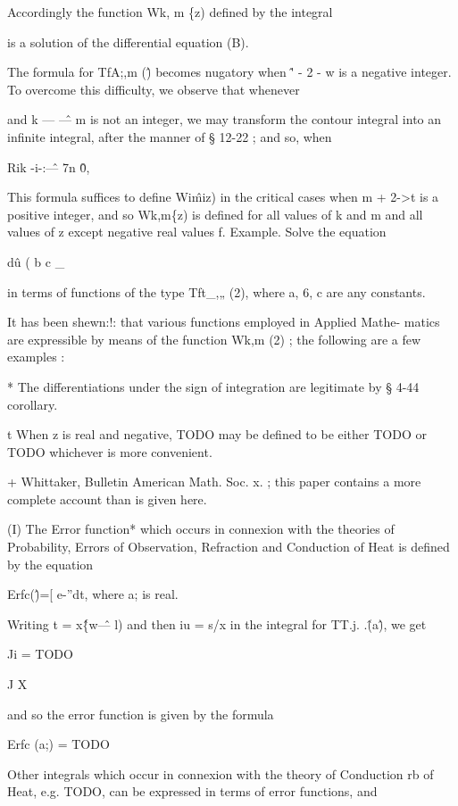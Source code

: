 Accordingly the function Wk, m \{z) defined by the integral

is a solution of the differential equation (B).

The formula for TfA;,m (\^) becomes nugatory when \^' - 2 - w is a
negative integer. To overcome this difficulty, we observe that
whenever

and k — \^— m is not an integer, we may transform the contour integral
into an infinite integral, after the manner of § 12-22 ; and so, when

Rik -i-:\^— 7n \^0,

This formula suffices to define Wi\^miz) in the critical cases when m
+ 2->t is a positive integer, and so Wk,m\{z) is defined for all
values of k and m and all values of z except negative real values f.
Example. Solve the equation

d\^u ( b c \_

in terms of functions of the type Tft\_,„ (2), where a, 6, c are any
constants.


It has been shewn:!: that various functions employed in Applied Mathe-
matics are expressible by means of the function Wk,m (2) ; the
following are a few examples :

* The differentiations under the sign of integration are legitimate by
§ 4-44 corollary.

t When z is real and negative, TODO may be defined to be either TODO
or TODO whichever is more convenient.

+ Whittaker, Bulletin American Math. Soc. x. ; this paper contains a
more complete account than is given here.

%
%
(I) The Error function* which occurs in connexion with the theories of
Probability, Errors of Observation, Refraction and Conduction of Heat
is defined by the equation

Erfc(\^)=[ e-''dt, where a; is real.

Writing t = x\^\{w\^ — l) and then iu = s/x in the integral for TT.j.
.\^(a\^), we get

Ji = TODO

J X

and so the error function is given by the formula

Erfc (a;) = TODO

Other integrals which occur in connexion with the theory of Conduction
rb of Heat, e.g. TODO, can be expressed in terms of error functions,
and

